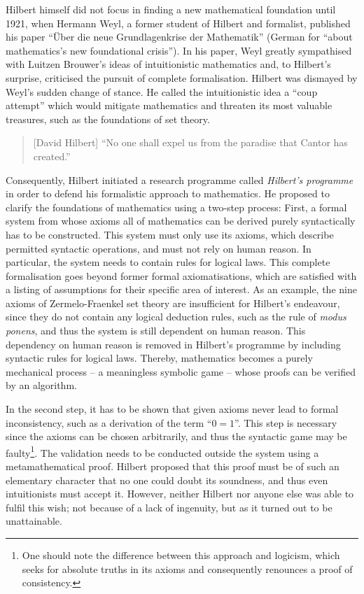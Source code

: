 \documentclass{article}
\begin{document}
Hilbert himself did not focus in finding a new mathematical foundation until 1921, when Hermann Weyl, a former student of Hilbert and formalist, published his paper ``Über die neue Grundlagenkrise der Mathematik'' (German for ``about mathematics's new foundational crisis''). In his paper, Weyl greatly sympathised with Luitzen Brouwer's ideas of intuitionistic mathematics and, to Hilbert's surprise, criticised the pursuit of complete formalisation. Hilbert was dismayed by Weyl's sudden change of stance. He called the intuitionistic idea a ``coup attempt'' which would mitigate mathematics and threaten its most valuable treasures, such as the foundations of set theory.\cite{hilbert_coup}
\begin{quote}[David Hilbert]
``No one shall expel us from the paradise that Cantor has created.''\cite{hilbert_paradise}
\end{quote}
Consequently, Hilbert initiated a research programme called \textit{Hilbert's programme} in order to defend his formalistic approach to mathematics. He proposed to clarify the foundations of mathematics using a two-step process: First, a formal system from whose axioms all of mathematics can be derived purely syntactically has to be constructed. This system must only use its axioms, which describe permitted syntactic operations, and must not rely on human reason. 
In particular, the system needs to contain rules for logical laws. This complete formalisation goes beyond former formal axiomatisations, which are satisfied with a listing of assumptions for their specific area of interest. As an example, the nine axioms of Zermelo-Fraenkel set theory are insufficient for Hilbert's endeavour, since they do not contain any logical deduction rules, such as the rule of \textit{modus ponens}, and thus the system is still dependent on human reason. This dependency on human reason is removed in Hilbert's programme by including syntactic rules for logical laws. Thereby, mathematics becomes a purely mechanical process -- a meaningless symbolic game -- whose proofs can be verified by an algorithm.

In the second step, it has to be shown that given axioms never lead to formal inconsistency, such as a derivation of the term ``$0=1$''. This step is necessary since the axioms can be chosen arbitrarily, and thus the syntactic game may be faulty\footnote{One should note the difference between this approach and logicism, which seeks for absolute truths in its axioms and consequently renounces a proof of consistency.}. The validation needs to be conducted outside the system using a metamathematical proof. Hilbert proposed that this proof must be of such an elementary character that no one could doubt its soundness, and thus even intuitionists must accept it. However, neither Hilbert nor anyone else was able to fulfil this wish; not because of a lack of ingenuity, but as it turned out to be unattainable.
\end{document}
